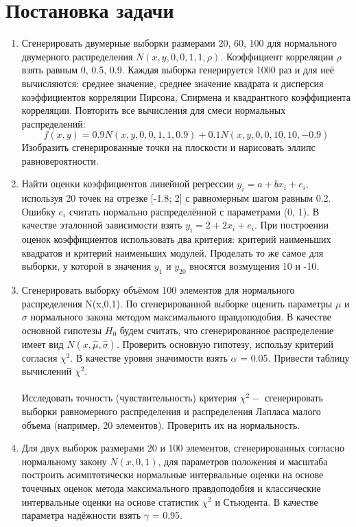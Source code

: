 \documentclass[a4paper,14pt]{article}
\begin{document}
	\section{Постановка задачи}
	\begin{enumerate}
		\item \noindent Сгенерировать двумерные выборки размерами 20, 60, 100 для нормального двумерного распределения $N(x,y,0,0,1,1,\rho)$. Коэффициент корреляции $\rho$ взять равным 0, 0.5, 0.9. Каждая выборка генерируется 1000 раз и для неё вычисляются: среднее значение, среднее значение квадрата и дисперсия коэффициентов корреляции Пирсона, Спирмена и квадрантного коэффициента корреляции. Повторить все вычисления для смеси нормальных распределений:
		\begin{equation}
			f(x,y) = 0.9N(x,y,0,0,1,1,0.9) + 0.1N(x,y,0,0,10,10,-0.9)
		\end{equation}
		\noindent Изобразить сгенерированные точки на плоскости и нарисовать эллипс равновероятности.
		\item \noindent Найти оценки коэффициентов линейной регрессии $y_{i} = a + bx_{i} + e_{i}$, используя 20 точек на отрезке [-1.8; 2] с равномерным шагом равным 0.2. Ошибку $e_{i}$ считать нормально распределённой с параметрами (0, 1). В качестве эталонной зависимости взять $y_{i} = 2 + 2x_{i} + e_{i}$. При построении оценок коэффициентов использовать два критерия: критерий наименьших квадратов и критерий наименьших модулей. Проделать то же самое для выборки, у которой в значения $y_{1}$ и $y_{20}$ вносятся возмущения 10 и -10. 
		\item \noindent Сгенерировать выборку объёмом 100 элементов для нормального распределения N(x,0,1). По сгенерированной выборке оценить параметры $\mu$ и $\sigma$ нормального закона методом максимального правдоподобия. В качестве основной гипотезы $H_{0}$ будем считать, что сгенерированное распределение имеет вид $N(x,\hat{\mu}, \hat{\sigma})$. Проверить основную гипотезу, использу критерий согласия $\chi^{2}$. В качестве уровня значимости взять $\alpha$ = 0.05. Привести таблицу вычислений $\chi^{2}$. 
		\\\\
		\noindent Исследовать точность (чувствительность) критерия $\chi^{2} - $ сгенерировать выборки равномерного распределения и распределения Лапласа малого объема (например, 20 элементов). Проверить их на нормальность.
		\item \noindent Для двух выборок размерами 20 и 100 элементов, сгенерированных согласно нормальному закону $N(x,0,1)$, для параметров положения и масштаба построить асимптотически нормальные интервальные оценки на основе точечных оценок метода максимального правдоподобия и классические интервальные оценки на основе статистик $\chi^{2}$ и Стьюдента. В качестве параметра надёжности взять $\gamma$ = 0.95.
	\end{enumerate}
	\newpage
\end{document}
